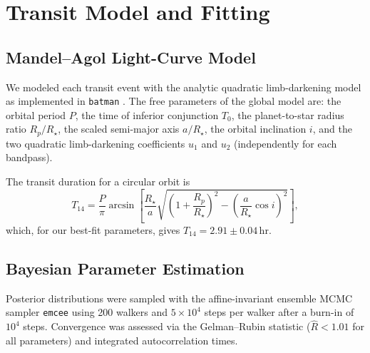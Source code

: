 \section{Transit Model and Fitting}
\label{sec:model}

\subsection{Mandel--Agol Light-Curve Model}
\label{sec:ma}

We modeled each transit event with the analytic \citet{MandelAgol2002}
quadratic limb-darkening model as implemented in \texttt{batman}
\citep{Kreidberg2015}.  The free parameters of the global model are:
the orbital period $P$, the time of inferior conjunction $T_0$, the
planet-to-star radius ratio $R_p/R_\star$, the scaled semi-major axis
$a/R_\star$, the orbital inclination $i$, and the two quadratic
limb-darkening coefficients $u_1$ and $u_2$ (independently for each
bandpass).

The transit duration for a circular orbit is
\begin{equation}
   T_{14} = \frac{P}{\pi}
            \arcsin\!\left[
              \frac{R_\star}{a}
              \sqrt{\!\left(1 + \frac{R_p}{R_\star}\right)^{\!2}
                    - \left(\frac{a}{R_\star}\cos i\right)^{\!2}}
            \right] ,
   \label{eq:t14}
\end{equation}
which, for our best-fit parameters, gives $T_{14} = 2.91 \pm 0.04\,\mathrm{hr}$.

\subsection{Bayesian Parameter Estimation}
\label{sec:bayes}

Posterior distributions were sampled with the affine-invariant ensemble
MCMC sampler \texttt{emcee} \citep{ForemanMackey2013} using 200 walkers
and $5\times 10^4$ steps per walker after a burn-in of $10^4$ steps.
Convergence was assessed via the Gelman--Rubin statistic ($\hat{R}<1.01$
for all parameters) and integrated autocorrelation times.

